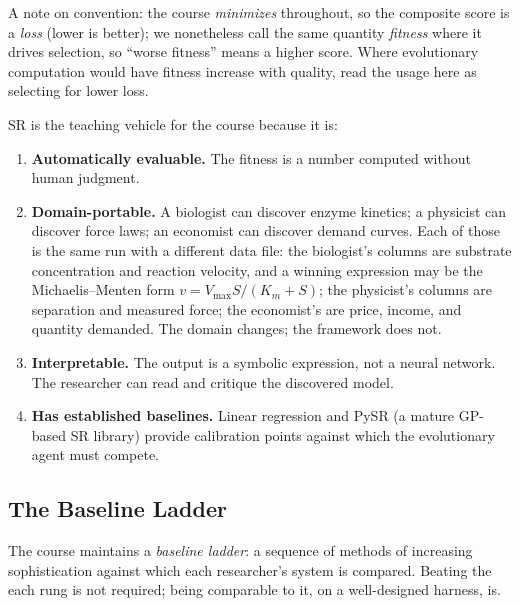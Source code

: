 A note on convention: the course \emph{minimizes} throughout, so the composite score is a \emph{loss} (lower is better); we nonetheless call the same quantity \emph{fitness} where it drives selection, so ``worse fitness'' means a higher score.
Where evolutionary computation would have fitness increase with quality, read the usage here as selecting for lower loss.

SR is the teaching vehicle for the course because it is:
\begin{enumerate}
\item \textbf{Automatically evaluable.} The fitness is a number computed without human judgment.
\item \textbf{Domain-portable.} A biologist can discover enzyme kinetics; a physicist can discover force laws; an economist can discover demand curves.
Each of those is the same run with a different data file: the biologist's columns are substrate concentration and reaction velocity, and a winning expression may be the Michaelis--Menten form $v = V_{\max} S / (K_m + S)$; the physicist's columns are separation and measured force; the economist's are price, income, and quantity demanded.
The domain changes; the framework does not.
\item \textbf{Interpretable.} The output is a symbolic expression, not a neural network.
The researcher can read and critique the discovered model.
\item \textbf{Has established baselines.} Linear regression and PySR (a mature GP-based SR library) provide calibration points against which the evolutionary agent must compete.
\end{enumerate}

\subsection{The Baseline Ladder}

The course maintains a \emph{baseline ladder}: a sequence of methods of increasing sophistication against which each researcher's system is compared.
Beating the each rung is not required; being comparable to it, on a well-designed harness, is.

